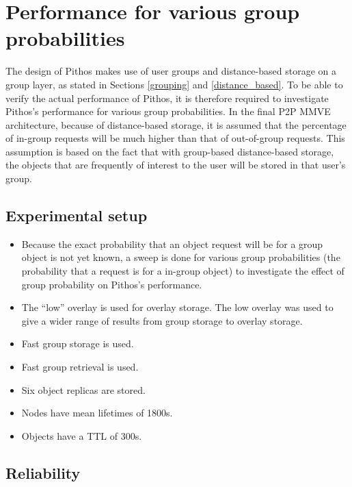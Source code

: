 \section{Performance for various group probabilities}
\label{group_probability_results}

The design of Pithos makes use of user groups and distance-based storage on a group layer, as stated in Sections \ref{grouping} and \ref{distance_based}. To be able to verify the actual performance of Pithos, it is therefore required to investigate Pithos's performance for various group probabilities. In the final P2P MMVE architecture, because of distance-based storage, it is assumed that the percentage of in-group requests will be much higher than that of out-of-group requests. This assumption is based on the fact that with group-based distance-based storage, the objects that are frequently of interest to the user will be stored in that user's group.

\subsection{Experimental setup}

\begin{itemize}
\item Because the exact probability that an object request will be for a group object is not yet known, a sweep is done for various group probabilities (the probability that a request is for a in-group object) to investigate the effect of group probability on Pithos's performance.

\item The ``low'' overlay is used for overlay storage. The low overlay was used to give a wider range of results from group storage to overlay storage.

 \item Fast  group storage is used.

 \item Fast group retrieval is used.

 \item Six object replicas are stored.

 \item Nodes have mean lifetimes of 1800s.

 \item Objects have a TTL of 300s.
\end{itemize}

\subsection{Reliability}

